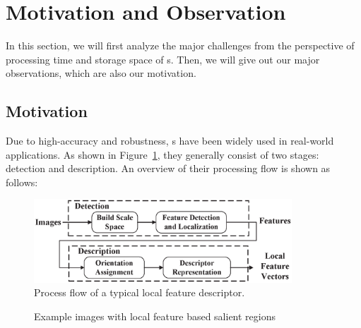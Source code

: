 \section{Motivation and Observation}
\label{sec:observation}

In this section, we will first analyze the major challenges from the perspective of processing time and storage space of {\lfea}s. Then, we will give out our major observations, which are also our motivation.



\subsection{Motivation}

Due to high-accuracy and robustness, {\lfea}s have been widely used in real-world applications. As shown in Figure~\ref{fig:workflow}, they generally consist of two stages: detection and description.  An overview of their processing flow is shown as follows:


\begin{figure}[!ht]
	\centering
	\includegraphics[width=3.8in]{images/fig-workflow.eps}
	\caption{Process flow of a typical local feature descriptor.}
	\label{fig:workflow}
\end{figure}


\begin{figure}[!ht]
	\centering
	\hfil
	\caption{Example images with local feature based salient regions}
	\label{fig:observations}
\end{figure}

